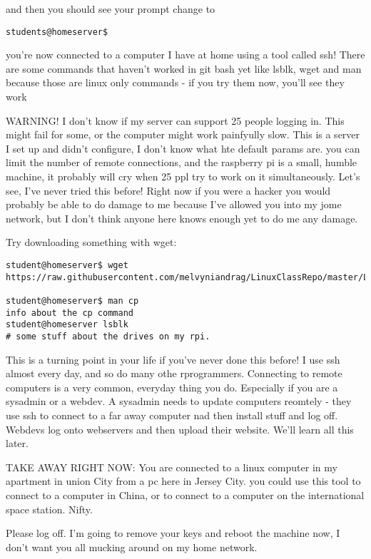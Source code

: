 \documentclass[10pt]{article}
\begin{document}
and then you should see your prompt change to 

\begin{lstlisting}[style=term]
students@homeserver$
\end{lstlisting}

you're now connected to a computer I have at home using a tool called ssh! There
are some commands that haven't worked in git bash yet like lsblk, wget and man
because those are linux only commands - if you try them now, you'll see they
work

{\LARGE WARNING! I don't know if my server can support 25 people logging in.
This might fail for some, or the computer might work painfyully slow. This is a
server I set up and didn't configure, I don't know what hte default params are.
you can limit the number of remote connections, and the raspberry pi is a small,
humble machine, it probably will cry when 25 ppl try to work on it
simultaneously. Let's see, I've never tried this before! Right now if you were a
hacker you would probably be able to do damage to me because I've allowed you
into my jome network, but I don't think anyone here knows enough yet to do me
any damage.}

Try downloading something with wget:

\begin{lstlisting}
student@homeserver$ wget
https://raw.githubusercontent.com/melvyniandrag/LinuxClassRepo/master/Lectures/Week03_SSHandMoreBash/a.txt

student@homeserver$ man cp
info about the cp command
student@homeserver lsblk
# some stuff about the drives on my rpi.
\end{lstlisting}

This is a turning point in your life if you've never done this before! I use ssh
almost every day, and so do many othe rprogrammers. Connecting to remote
computers is a very common, everyday thing you do. Especially if you are a
sysadmin or a webdev. A sysadmin needs to update computers reomtely - they use
ssh to connect to a far away computer nad then install stuff and log off.
Webdevs log onto webservers and then upload their website. We'll learn all this
later.

TAKE AWAY RIGHT NOW: You are connected to a linux computer in my apartment in
union City from a pc here in Jersey City. you could use this tool to connect to
a computer in China, or to connect to a computer on the international space
station. Nifty.

Please log off. I'm going to remove your keys and reboot the machine now, I
don't want you all mucking around on my home network.
\end{document}
